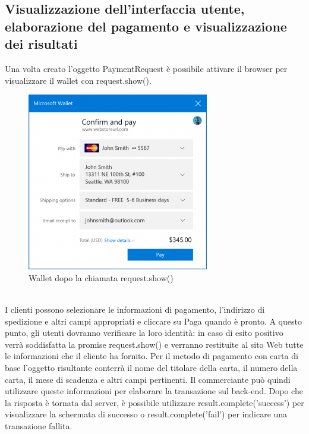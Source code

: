 \documentclass[italian]{article}
\begin{document}
	\subsection{Visualizzazione dell'interfaccia utente, elaborazione del pagamento e visualizzazione dei risultati}
	Una volta creato l'oggetto PaymentRequest è possibile attivare il browser per visualizzare il wallet con request.show(). 
	\begin{figure}[h]
		\centering
		\includegraphics[width=1\linewidth]{wallet1}
		\caption{Wallet dopo la chiamata request.show()}
		\label{fig: Wallet dopo la chiamata request.show()}
	\end{figure}
	\pagebreak
	\\
	I clienti possono  selezionare le informazioni di pagamento, l'indirizzo di spedizione e altri campi appropriati e cliccare su Paga quando è pronto. A questo punto, gli utenti dovranno verificare la loro identità: in caso di esito positivo verrà soddisfatta la promise request.show() e verranno restituite al sito Web tutte le informazioni che il cliente ha fornito. Per il metodo di pagamento con carta di base l'oggetto risultante conterrà il nome del titolare della carta, il numero della carta, il mese di scadenza e altri campi pertinenti. Il commerciante può quindi utilizzare queste informazioni per elaborare la transazione sul back-end.
	Dopo che la risposta è tornata dal server, è possibile utilizzare result.complete('success') per visualizzare la schermata di successo o result.complete('fail') per indicare una transazione fallita.
\end{document}
